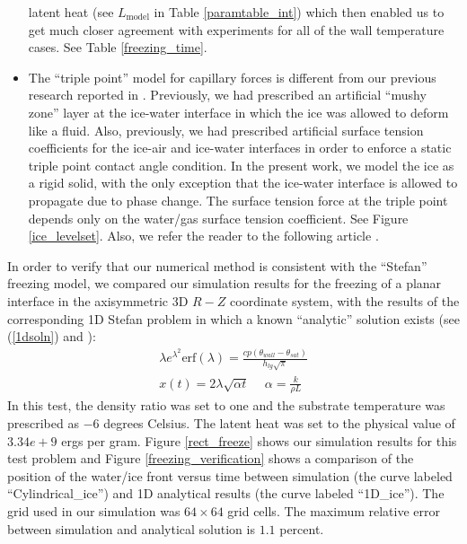 \documentclass[]{article}
\begin{document}
\begin{itemize}
 latent heat (see $L_{\mbox{model}}$ in 
 Table \ref{paramtable_int}) which then 
 enabled us to get much closer agreement with experiments 
 for all of the wall temperature cases.  See
 Table \ref{freezing_time}.
\item The ``triple point'' model for capillary forces is different from
 our previous research reported in \cite{vahab2016adaptive}.  Previously, we
 had prescribed an artificial ``mushy zone'' layer at the
 ice-water interface in which the ice was allowed to deform 
 like a fluid.  Also, previously, we had prescribed
 artificial surface tension 
 coefficients for the 
 ice-air and ice-water interfaces in order to enforce a static
 triple point contact angle condition.  
 In the present work, we model the
 ice as a rigid solid, with the only exception 
 that the ice-water interface
 is allowed to propagate due to phase change.  The surface tension
 force at the triple point depends only on the water/gas surface
 tension coefficient.  See Figure \ref{ice_levelset}. Also, we
 refer the reader to the following article \cite{lyu2021hybrid}.
\end{itemize}

In order to verify that our numerical method is consistent with the
``Stefan'' freezing model, we compared our simulation results
for the freezing of a 
planar interface in the axisymmetric 3D $R-Z$ coordinate system,
with the results of the corresponding 1D Stefan problem in which
a known ``analytic'' solution exists (see (\ref{1dsoln}) and
\cite{welch2000volume}):
\begin{eqnarray}
\lambda e^{\lambda^{2}}\mbox{erf}(\lambda)=
\frac{cp(\theta_{wall}-\theta_{sat})}{h_{lg}\sqrt{\pi}} \label{1dsoln} \\
x(t)=2\lambda\sqrt{\alpha t} \hspace{15pt} \alpha=\frac{k}{\rho L} 
\nonumber 
\end{eqnarray}
In this test, the
density ratio was set to one and the substrate temperature was prescribed
as $-6$ degrees Celsius.  The latent heat was set to the physical
value of $3.34e+9$ ergs per gram.  Figure \ref{rect_freeze} shows
our simulation results for this test problem and 
Figure \ref{freezing_verification}
shows a comparison of the position of the water/ice front versus time
between simulation (the curve labeled ``Cylindrical\_ice'') and 
1D analytical results (the curve labeled ``1D\_ice'').  The grid used in our
simulation was $64\times 64$ grid cells. The maximum relative
error between simulation and analytical solution is $1.1$ percent.
\end{document}
